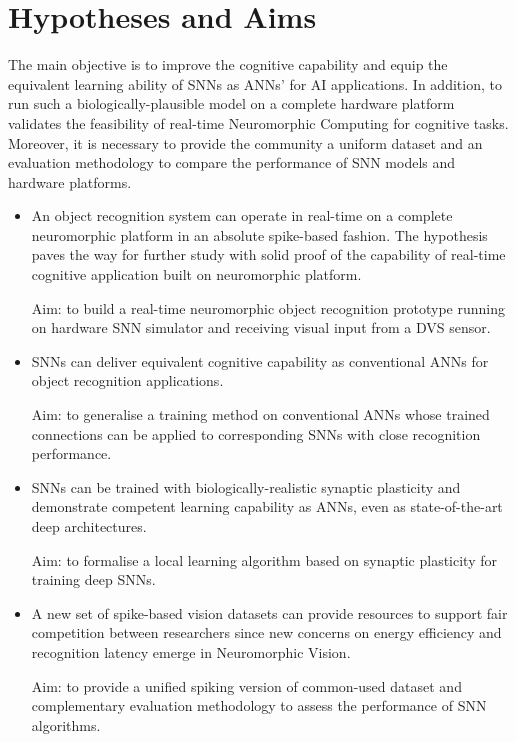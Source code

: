 \section{Hypotheses and Aims}
\label{sec:aim}
The main objective is to improve the cognitive capability and equip the equivalent learning ability of SNNs as ANNs' for AI applications.
In addition, to run such a biologically-plausible model on a complete hardware platform validates the feasibility of real-time Neuromorphic Computing for cognitive tasks.
Moreover, it is necessary to provide the community a uniform dataset and an evaluation methodology to compare the performance of SNN models and hardware platforms.

\begin{itemize}
	\item 
	An object recognition system can operate in real-time on a complete neuromorphic platform in an absolute spike-based fashion.
	The hypothesis paves the way for further study with solid proof of the capability of real-time cognitive application built on neuromorphic platform.

	Aim: to build a real-time neuromorphic object recognition prototype running on hardware SNN simulator and receiving visual input from a DVS sensor.

	\item 
	SNNs can deliver equivalent cognitive capability as conventional ANNs for object recognition applications.

	Aim: to generalise a training method on conventional ANNs whose trained connections can be applied to corresponding SNNs with close recognition performance.

	\item 
	SNNs can be trained with biologically-realistic synaptic plasticity and demonstrate competent learning capability as ANNs, even as state-of-the-art deep architectures.

	Aim: to formalise a local learning algorithm based on synaptic plasticity for training deep SNNs.

	\item 
	A new set of spike-based vision datasets can provide resources to support fair competition between researchers since new concerns on energy efficiency and recognition latency emerge in Neuromorphic Vision.

	Aim: to provide a unified spiking version of common-used dataset and complementary evaluation methodology to assess the performance of SNN algorithms.
\end{itemize}



